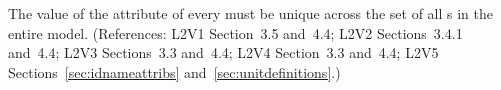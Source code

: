 The value of the  attribute of every \UnitDefinition must be
unique across the set of all \UnitDefinition{}s in the entire
model.  (References: L2V1 Section~3.5 and~4.4; L2V2 Sections~3.4.1 and~4.4;
L2V3 Sections~3.3 and~4.4; L2V4 Section~3.3 and~4.4; L2V5 Sections~\ref{sec:idnameattribs} and~\ref{sec:unitdefinitions}.)
